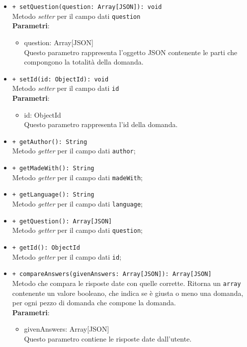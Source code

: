 \begin{itemize}
\begin{itemize}
				\item \texttt{+ setQuestion(question: Array[JSON]): void} \\
				Metodo \textit{setter} per il campo dati \texttt{question}\\
				\textbf{Parametri}:
				\begin{itemize}
					\item {question: Array[JSON]}\\
					Questo parametro rappresenta l'oggetto JSON contenente le parti che compongono la totalità della domanda.
				\end{itemize}
				
				\item \texttt{+ setId(id: ObjectId): void} \\
				Metodo \textit{setter} per il campo dati \texttt{id}\\
				\textbf{Parametri}:
				\begin{itemize}
					\item {id: ObjectId}\\
					Questo parametro rappresenta l'id della domanda.
				\end{itemize}
				
				\item \texttt{+ getAuthor(): String} \\
				Metodo \textit{getter} per il campo dati \texttt{author};
				
				\item \texttt{+ getMadeWith(): String} \\
				Metodo \textit{getter} per il campo dati \texttt{madeWith};
				
				\item \texttt{+ getLanguage(): String} \\
				Metodo \textit{getter} per il campo dati \texttt{language};

				\item \texttt{+ getQuestion(): Array[JSON]} \\
				Metodo \textit{getter} per il campo dati \texttt{question};
				
				\item \texttt{+ getId(): ObjectId} \\
				Metodo \textit{getter} per il campo dati \texttt{id};
				
				\item \texttt{+ compareAnswers(givenAnswers: Array[JSON]): Array[JSON]} \\
				Metodo che compara le risposte date con quelle corrette. Ritorna un \texttt{array} contenente un valore booleano, che indica se è giusta o meno una domanda, per ogni pezzo di domanda che compone la domanda. \\
				\textbf{Parametri}:
				\begin{itemize}
					\item {givenAnswers: Array[JSON]}\\
					Questo parametro contiene le risposte date dall'utente. 
				\end{itemize}
				

\end{itemize}
\end{itemize}
